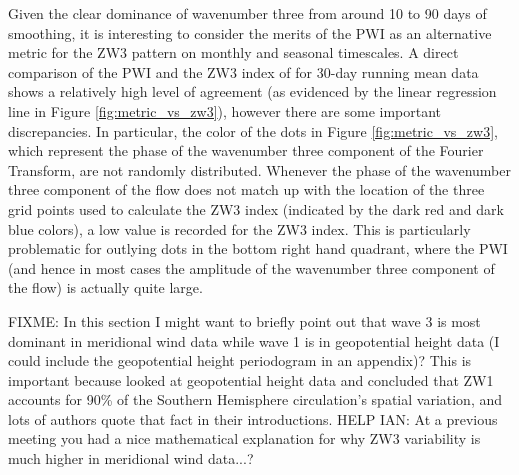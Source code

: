 Given the clear dominance of wavenumber three from around 10 to 90 days of smoothing, it is interesting to consider the merits of the PWI as an alternative metric for the ZW3 pattern on monthly and seasonal timescales. A direct comparison of the PWI and the ZW3 index of \citet{Raphael2004} for 30-day running mean data shows a relatively high level of agreement (as evidenced by the linear regression line in Figure \ref{fig:metric_vs_zw3}), however there are some important discrepancies. In particular, the color of the dots in Figure \ref{fig:metric_vs_zw3}, which represent the phase of the wavenumber three component of the Fourier Transform, are not randomly distributed. Whenever the phase of the wavenumber three component of the flow does not match up with the location of the three grid points used to calculate the ZW3 index (indicated by the dark red and dark blue colors), a low value is recorded for the ZW3 index. This is particularly problematic for outlying dots in the bottom right hand quadrant, where the PWI (and hence in most cases the amplitude of the wavenumber three component of the flow) is actually quite large.      

FIXME: In this section I might want to briefly point out that wave 3 is most dominant in meridional wind data while wave 1 is in geopotential height data (I could include the geopotential height periodogram in an appendix)? This is important because \citet{vanLoon1972} looked at geopotential height data and concluded that ZW1 accounts for 90\% of the Southern Hemisphere circulation's spatial variation, and lots of authors quote that fact in their introductions. HELP IAN: At a previous meeting you had a nice mathematical explanation for why ZW3 variability is much higher in meridional wind data...? 

